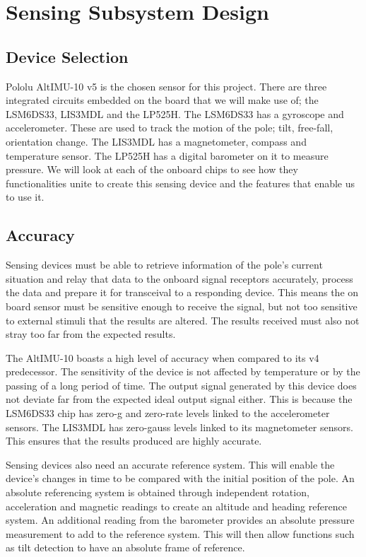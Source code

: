 \documentclass[12pt]{article}
\begin{document}
\section{Sensing Subsystem Design}
\subsection{Device Selection}
Pololu AltIMU-10 v5 is the chosen sensor for this project. There are three integrated circuits embedded on the board that
we will make use of; the LSM6DS33, LIS3MDL and the LP525H. The LSM6DS33 has a gyroscope and accelerometer. 
These are used to track the motion of the pole; tilt, free-fall, orientation change. 
The LIS3MDL has a magnetometer, compass and temperature sensor.
The LP525H has a digital barometer on it to measure pressure. 
We will look at each of the onboard chips to see how they functionalities unite to create this sensing device and the 
features that enable us to use it. 

\subsection{Accuracy}
Sensing devices must be able to retrieve information of the pole’s current situation and relay that data to the onboard 
signal receptors accurately, process the data and prepare it for transceival to a responding device. This means the on 
board sensor must be sensitive enough to receive the signal, but not too sensitive to external stimuli that the results 
are altered. The results received must also not stray too far from the expected results.

The AltIMU-10 boasts a high level of accuracy when compared to its v4 predecessor. 
The sensitivity of the device is not affected by temperature or by the passing of a long period of time. 
The output signal generated by this device does not deviate far from the expected ideal output signal either. 
This is because the LSM6DS33 chip has zero-g and zero-rate levels linked to the accelerometer sensors. 
The LIS3MDL has zero-gauss levels linked to its magnetometer sensors. 
This ensures that the results produced are highly accurate. 

Sensing devices also need an accurate reference system. This will enable the device's changes in time to be compared 
with the initial position of the pole. An absolute referencing system is obtained through independent rotation, 
acceleration and magnetic readings to create an altitude and heading reference system. An additional reading from the 
barometer provides an absolute pressure measurement to add to the reference system. 
This will then allow functions such as tilt detection to have an absolute frame of reference. 
\end{document}
